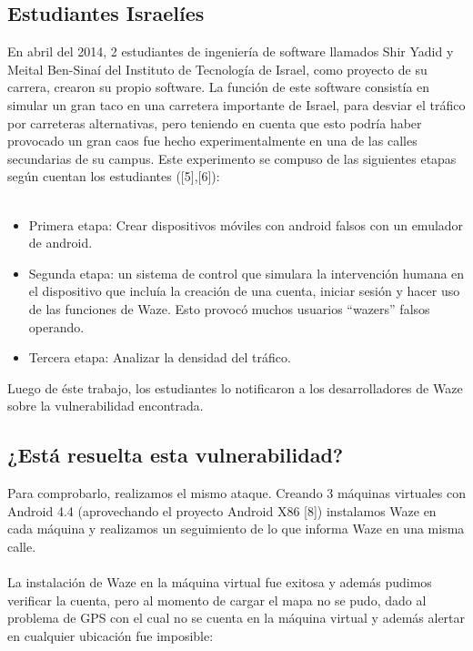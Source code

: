 \subsection{Estudiantes Israelíes}

En abril del 2014, 2 estudiantes de ingeniería de software llamados Shir Yadid y Meital Ben-Sinaí del Instituto de Tecnología de Israel, como proyecto de su carrera, crearon su propio software. La función de este software consistía en simular un gran taco en una carretera importante de Israel, para desviar el tráfico por carreteras alternativas, pero teniendo en cuenta que esto podría haber provocado un gran caos fue hecho experimentalmente en una de las calles secundarias de su campus.
Este experimento se compuso de las siguientes etapas según cuentan los estudiantes  ([5],[6]):
\\\\
\begin{itemize}
\item Primera etapa: Crear dispositivos móviles con android falsos con un emulador de android. 
\item Segunda etapa: un sistema de control que simulara la intervención humana en el dispositivo que incluía la creación de una cuenta, iniciar sesión y hacer uso de las funciones de Waze. Esto provocó muchos usuarios “wazers” falsos operando.
\item Tercera etapa: Analizar la densidad del tráfico.
\end{itemize}

Luego de éste trabajo, los estudiantes lo notificaron a los desarrolladores de Waze sobre la vulnerabilidad encontrada.


\subsection{¿Está resuelta esta vulnerabilidad?}

Para comprobarlo, realizamos el mismo ataque. Creando 3 máquinas virtuales con Android 4.4 (aprovechando el proyecto Android X86 [8]) instalamos Waze en cada máquina y realizamos un seguimiento de lo que informa Waze en una misma calle.
\\\\
La instalación de Waze en la máquina virtual fue exitosa y además pudimos verificar la cuenta, pero al momento de cargar el mapa no se pudo, dado al problema de GPS con el cual no se cuenta en la máquina virtual y además alertar en cualquier ubicación fue imposible:



